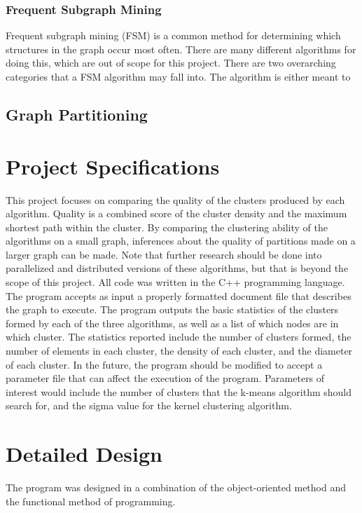 \documentclass[12pt]{article}
\begin{document}
\subsubsection{Frequent Subgraph Mining}
Frequent subgraph mining (FSM) is a common method for determining which structures in the graph occur most often. There are many different algorithms for doing this, which are out of scope for this project.
\newline\newline
There are two overarching categories that a FSM algorithm may fall into. The algorithm is either meant to 

\subsection{Graph Partitioning}

\newpage
\section{Project Specifications}
This project focuses on comparing the quality of the clusters produced by each algorithm. Quality is a combined score  of the cluster density and the maximum shortest path within the cluster. By comparing the clustering ability of the algorithms on a small graph, inferences about the quality of partitions made on a larger graph can be made. Note that further research should be done into parallelized and distributed versions of these algorithms, but that is beyond the scope of this project.
\newline\newline
All code was written in the C++ programming language. The program accepts as input a properly formatted document file that describes the graph to execute. The program outputs the basic statistics of the clusters formed by each of the three algorithms, as well as a list of which nodes are in which cluster. The statistics reported include the number of clusters formed, the number of elements in each cluster, the density of each cluster, and the diameter of each cluster.
\newline\newline
In the future, the program should be modified to accept a parameter file that can affect the execution of the program. Parameters of interest would include the number of clusters that the k-means algorithm should search for, and the sigma value for the kernel clustering algorithm.

\newpage
\section{Detailed Design}
The program was designed in a combination of the object-oriented method and the functional method of programming.
\end{document}
